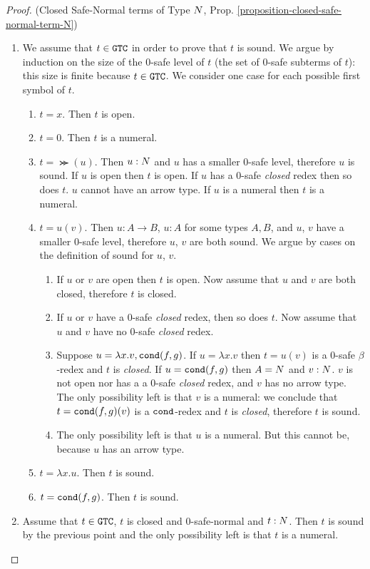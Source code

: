 \begin{proof}(Closed Safe-Normal terms of Type ${N}$, 
Prop. \ref{proposition-closed-safe-normal-term-N})
\begin{enumerate}
\item
We assume that $t \in {\tt GTC}$ in order to prove that $t$ is sound.
We argue by  induction on the size of the $0$-safe level of $t$ (the set of $0$-safe subterms
of $t$): this size is finite because $t \in {\tt GTC}$. 
We consider one case for each possible first symbol of $t$.

\begin{enumerate}
\item
$t =x$. Then $t$ is open.

\item
$t=0$. Then $t$ is a numeral.

\item
$t = \Succ(u)$. Then $u:{N}$ and $u$ has a smaller $0$-safe level, therefore $u$ is sound. 
If $u$ is open then $t$ is open. If $u$ has a $0$-safe \emph{closed} 
redex then so does $t$. $u$ cannot have an arrow type. If $u$
is a numeral then $t$ is a numeral.

\item
$t=u(v)$. Then $u:A \rightarrow B$, $u:A$ for some types $A, B$, 
and $u$, $v$ have a smaller $0$-safe level, therefore $u$, $v$ are both sound. 
We argue by cases on the definition of sound for $u$, $v$.
\begin{enumerate}
\item
If $u$ or $v$ are open then $t$ is open. 
Now assume that $u$ and $v$ are both closed, therefore $t$ is closed.
\item
If $u$ or $v$ have a $0$-safe \emph{closed} redex, then so does $t$.
Now assume that $u$ and $v$ have no $0$-safe \emph{closed} redex.
\item
Suppose $u = \lambda x.v, {\tt cond}(f,g)$. 
If $u = \lambda x.v$ then $t=u(v)$ is a $0$-safe $\beta$-redex and $t$ is \emph{closed}.
If $u = {\tt cond}(f,g)$ then $A = {N}$ and $v:{N}$. 
$v$ is not open nor has a a $0$-safe \emph{closed} redex, and $v$ has no arrow type. 
The only possibility left is that $v$ is a numeral: 
we conclude that $t={\tt cond}(f,g)(v)$ is a ${\tt cond}$-redex and $t$ is \emph{closed},
therefore $t$ is sound.
\item
The only possibility left is that $u$ is a numeral. 
But this cannot be, because $u$ has an arrow type.
\end{enumerate}

\item
$t = \lambda x.u$. Then $t$ is sound.

\item
$t = {\tt cond}(f,g)$. Then $t$ is sound.
\end{enumerate}

\item
Assume that $t \in {\tt GTC}$, $t$ is closed and $0$-safe-normal and $t:{N}$.
Then $t$ is sound by the previous point and the only possibility left is that $t$ is 
a numeral.
\end{enumerate}
\end{proof}
